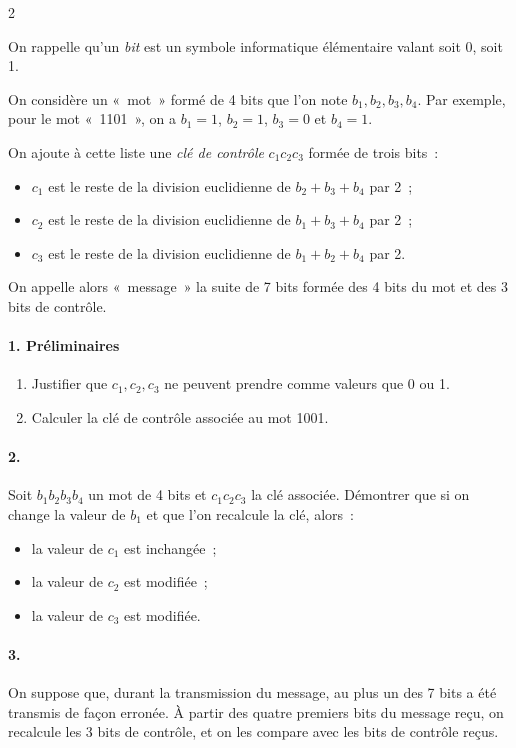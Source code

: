 \documentclass[a4paper,12pt]{article}
\begin{document}
\begin{multicols}{2}
\begin{exercice}[title=Exercice 19 $\star\star\star$ { [Modéliser, Calculer] }]{}{}
  On rappelle qu’un \emph{bit} est un symbole informatique élémentaire valant soit 0, soit 1.

  On considère un «~mot~» formé de 4 bits que l’on note $b_1, b_2, b_3, b_4$.
  Par exemple, pour le mot «~1101~», on a $b_1 = 1$, $b_2 = 1$, $b_3 = 0$ et $b_4 = 1$.

  On ajoute à cette liste une \emph{clé de contrôle} $c_1 c_2 c_3$ formée de trois bits :
  \begin{itemize}
    \item $c_1$ est le reste de la division euclidienne de $b_2 + b_3 + b_4$ par 2 ;
    \item $c_2$ est le reste de la division euclidienne de $b_1 + b_3 + b_4$ par 2 ;
    \item $c_3$ est le reste de la division euclidienne de $b_1 + b_2 + b_4$ par 2.
  \end{itemize}

  On appelle alors «~message~» la suite de 7 bits formée des 4 bits du mot et des 3 bits de contrôle.

  \paragraph{1. Préliminaires}
  \begin{enumerate}
    \item[(a)] Justifier que $c_1, c_2, c_3$ ne peuvent prendre comme valeurs que 0 ou 1.
    \item[(b)] Calculer la clé de contrôle associée au mot 1001.
  \end{enumerate}

  \paragraph{2.} Soit $b_1 b_2 b_3 b_4$ un mot de 4 bits et $c_1 c_2 c_3$ la clé associée.
  Démontrer que si on change la valeur de $b_1$ et que l’on recalcule la clé, alors :
  \begin{itemize}
    \item la valeur de $c_1$ est inchangée ;
    \item la valeur de $c_2$ est modifiée ;
    \item la valeur de $c_3$ est modifiée.
  \end{itemize}
  \newcolumn
  \paragraph{3.} On suppose que, durant la transmission du message, au plus un des 7 bits a été transmis de façon erronée. À partir des quatre premiers bits du message reçu, on recalcule les 3 bits de contrôle, et on les compare avec les bits de contrôle reçus.
  

\end{exercice}
\end{multicols}
\end{document}
